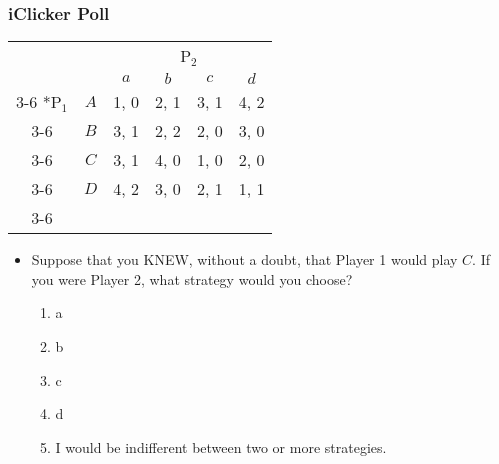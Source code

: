 \begin{frame}
\frametitle{iClicker Poll}
\begin{table}[h]
\centering
\begin{tabular}{cc|c|c|c|c|}
	& \multicolumn{1}{c}{} & \multicolumn{4}{c}{P$_2$}\\
	& \multicolumn{1}{c}{} & \multicolumn{1}{c}{$a$} & \multicolumn{1}{c}{$b$} & \multicolumn{1}{c}{$c$} & \multicolumn{1}{c}{$d$} \\\cline{3-6}
	\multirow{4}*{P$_1$}  & $A$ & 1, 0 & 2, 1 & 3, 1 & 4, 2 \\\cline{3-6}
	& $B$ & 3, 1 & 2, 2 & 2, 0 & 3, 0 \\\cline{3-6}
	& $C$ & 3, 1 & 4, 0 & 1, 0 & 2, 0 \\\cline{3-6}
	& $D$ & 4, 2 & 3, 0 & 2, 1 & 1, 1 \\\cline{3-6}
\end{tabular}
\end{table}
\begin{itemize}
\item Suppose that you KNEW, without a doubt, that Player 1 would play $C$. If you were Player 2, what strategy would you choose?
\begin{enumerate}
	\item a
	\item b
	\item c
	\item d
	\item I would be indifferent between two or more strategies.
\end{enumerate}
\end{itemize}
\end{frame}

